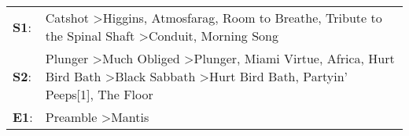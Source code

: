 \begin{supertabular}{p{0.03\textwidth}p{0.92\textwidth}}
 \textbf{S1}:  &                                                                                                                                           Catshot\textsuperscript{} \textgreater \enspace Higgins\textsuperscript{}, \enspace Atmosfarag\textsuperscript{}, \enspace Room to Breathe\textsuperscript{}, \enspace Tribute to the Spinal Shaft\textsuperscript{} \textgreater \enspace Conduit\textsuperscript{}, \enspace Morning Song\textsuperscript{}  \enspace  \\
 \textbf{S2}:  &  Plunger\textsuperscript{} \textgreater \enspace Much Obliged\textsuperscript{} \textgreater \enspace Plunger\textsuperscript{}, \enspace Miami Virtue\textsuperscript{}, \enspace Africa\textsuperscript{}, \enspace Hurt Bird Bath\textsuperscript{} \textgreater \enspace Black Sabbath\textsuperscript{} \textgreater \enspace Hurt Bird Bath\textsuperscript{}, \enspace Partyin' Peeps[1]\textsuperscript{}, \enspace The Floor\textsuperscript{}  \enspace  \\
 \textbf{E1}:  &                                                                                                                                                                                                                                                                                                                                                                               Preamble\textsuperscript{} \textgreater \enspace Mantis\textsuperscript{}  \enspace  \\
\end{supertabular}
